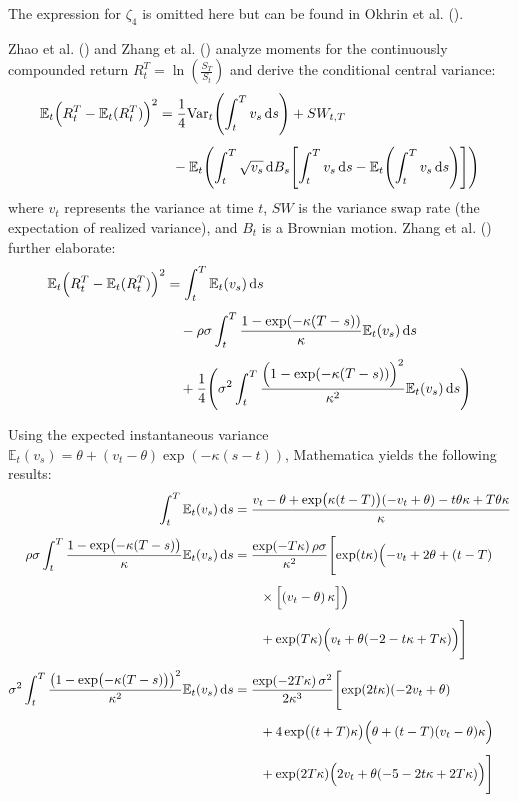 The expression for $\zeta_4$ is omitted here but can be found in Okhrin et al. (\citeyear{okhrinSimulatingCoxIngersoll2022}).

Zhao et al. (\citeyear{zhaoRelationPhysicalRiskneutral2013}) and Zhang et al.  (\citeyear{zhangSkewnessImpliedHeston2017}) analyze moments for the continuously compounded return $R_t^T = \ln\left(\frac{S_T}{S_t}\right)$ and derive the conditional central variance:
\begin{align}
    \mathbb{E}_t\Bigl(R_t^T-\mathbb{E}_t(R_t^T)\Bigr)^2 
    &= \frac{1}{4}\text{Var}_t\Biggl(\int_t ^T v_s\,\mathrm{d}s\Biggr) + SW_{t,T} \notag\\[1ex]
    &\quad - \mathbb{E}_t\Biggl(
        \int_t^T \sqrt{v_s}\,\mathrm{d}B_s
        \Biggl[\int_t^T v_s\,\mathrm{d}s-\mathbb{E}_t\Biggl(\int_t^T v_s\,\mathrm{d}s\Biggr)\Biggr]
    \Biggr) \notag
\end{align}    
where $v_t$ represents the variance at time $t$, $SW$ is the variance swap rate (the expectation of realized variance), and $B_t$ is a Brownian motion. Zhang et al. (\citeyear{zhangSkewnessImpliedHeston2017}) further elaborate:
\begin{align}
    \mathbb{E}_t\Bigl(R_t^T-\mathbb{E}_t(R_t^T)\Bigr)^2 &= \int_t^T \mathbb{E}_t(v_s)\,\mathrm{d}s \notag\\[1ex]
    &\quad - \rho\sigma\int_t^T \frac{1-\exp(-\kappa(T-s))}{\kappa}\mathbb{E}_t(v_s)\,\mathrm{d}s \notag\\[1ex]
    &\quad + \frac{1}{4}\Biggl(\sigma^2\int_t^T\frac{\Bigl(1-\exp(-\kappa(T-s))\Bigr)^2}{\kappa^2}\mathbb{E}_t(v_s) \,\mathrm{d}s\Biggr) \notag
\end{align}
    
Using the expected instantaneous variance $\mathbb{E}_t(v_s) = \theta + (v_t - \theta)\exp(-\kappa(s-t))$, Mathematica yields the following results:
\begin{align}
    \int_t^T \mathbb{E}_t(v_s)\,\mathrm{d}s 
    &= \frac{v_t - \theta + \exp\bigl(\kappa(t-T)\bigr)(-v_t+\theta) - t \theta\kappa + T\theta\kappa}{\kappa} \notag \\[1ex]
    \rho\sigma\int_t^T \frac{1-\exp\bigl(-\kappa(T-s)\bigr)}{\kappa}\mathbb{E}_t(v_s)\,\mathrm{d}s 
    &= \frac{\exp(-T\kappa)\,\rho\sigma}{\kappa^2} \Biggl[
        \exp(t\kappa)\Bigl(-v_t+2\theta+(t-T)
        \notag\\[1ex]
    &\quad\quad\times \Bigl[(v_t-\theta)\,\kappa\Bigr]\Bigr) \notag\\[1ex]
    &\quad\quad + \exp(T\kappa)\Bigl(v_t+\theta(-2-t\kappa+T\kappa)\Bigr)
    \Biggr] \notag \\[1ex]
    \sigma^2\int_t^T\frac{\bigl(1-\exp\bigl(-\kappa(T-s)\bigr)\bigr)^2}{\kappa^2}\mathbb{E}_t(v_s) \,\mathrm{d}s 
    &= \frac{\exp(-2T\kappa)\,\sigma^2}{2\kappa^3} \Biggl[
        \exp(2t\kappa)(-2v_t+\theta) \notag\\[1ex]
    &\quad\quad + 4\exp\bigl((t+T)\kappa\bigr)\Bigl(\theta+(t-T)(v_t-\theta)\kappa\Bigr) \notag\\[1ex]
    &\quad\quad + \exp(2T\kappa)\Bigl(2v_t+\theta(-5-2t\kappa+2T\kappa)\Bigr)
    \Biggr] \notag
\end{align}
    
